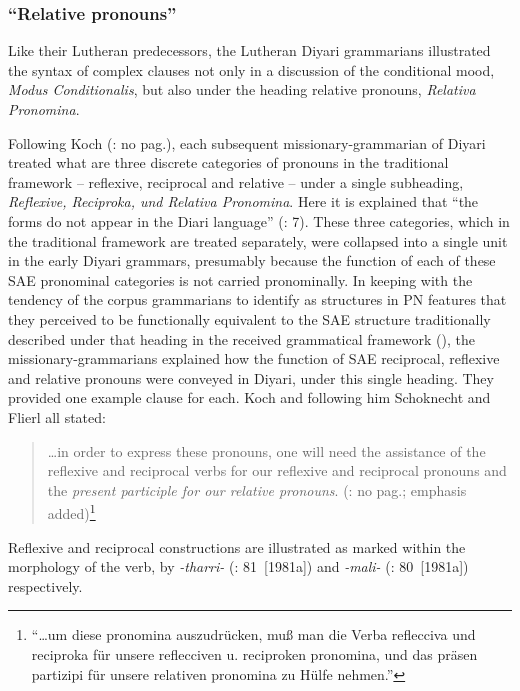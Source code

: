 \subsubsection{“Relative pronouns''}
\label{sec:key:8.7.3.3}\label{bkm:Ref339715229}\label{bkm:Ref339742580}

Like their Lutheran predecessors, the Lutheran Diyari grammarians illustrated the syntax of complex clauses not only in a discussion of the conditional mood, \textit{Modus Conditionalis}, but also under the heading relative pronouns, \textit{Relativa Pro\-nom\-ina}.

\newpage
Following Koch (\citeyear{koch_untitled_1868}: no pag.), each subsequent missionary-grammarian of Diyari treated what are three discrete categories of pronouns in the traditional framework – reflexive, reciprocal and relative – under a single subheading, \textit{Reflexive, Reciproka, und Relativa Pronomina}. Here it is explained that “the forms do not appear in the Diari language” (\citealt{schoknecht_grammar_1947}: 7). These three categories, which in the traditional framework are treated separately, were collapsed into a single unit in the early Diyari grammars, presumably because the function of each of these SAE pronominal categories is not carried pronominally. In keeping with the tendency of the corpus grammarians to identify as structures in PN features that they perceived to be functionally equivalent to the SAE structure traditionally described under that heading in the received grammatical framework (), the missionary-grammarians explained how the function of SAE reciprocal, reflexive and relative pronouns were conveyed in Diyari, under this single heading. They provided one example clause for each. Koch and following him Schoknecht and Flierl all stated:


\begin{quote}
…in order to express these pronouns, one will need the assistance of the reflexive and reciprocal verbs for our reflexive and reciprocal pronouns and the \textit{present participle for our relative pronouns}. (\citealt{koch_untitled_1868}: no pag.; emphasis added)\footnote{“…um diese pronomina auszudrücken, muß man die Verba reflecciva und reciproka für unsere reflecciven u. reciproken pronomina, und das präsen partizipi für unsere relativen pronomina zu Hülfe nehmen.''}
\end{quote}

Reflexive and reciprocal constructions are illustrated as marked within the morphology of the verb, by \textit{-tharri-} (\citealt{austin_grammar_2013}: 81~[1981a]) and \textit{{}-mali-} (\citealt{austin_grammar_2013}: 80~[1981a]) respectively.

